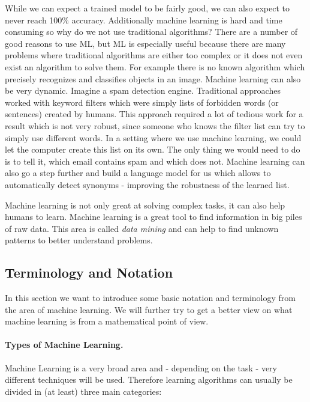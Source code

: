 While we can expect a trained model to be fairly good, we can also expect to never reach 100\% accuracy. Additionally machine learning is hard and time consuming so why do we not use traditional algorithms? There are a number of good reasons to use ML, but ML is especially useful because there are many problems where traditional algorithms are either too complex or it does not even exist an algorithm to solve them. For example there is no known algorithm which precisely recognizes and classifies objects in an image. Machine learning can also be very dynamic. Imagine a spam detection engine. Traditional approaches worked with keyword filters which were simply lists of forbidden words (or sentences) created by humans. This approach required a lot of tedious work for a result which is not very robust, since someone who knows the filter list can try to simply use different words. In a setting where we use machine learning, we could let the computer create this list on its own. The only thing we would need to do is to tell it, which email contains spam and which does not. Machine learning can also go a step further and build a language model for us which allows to automatically detect synonyms - improving the robustness of the learned list. 

Machine learning is not only great at solving complex tasks, it can also help humans to learn. Machine learning is a great tool to find information in big piles of raw data. This area is called \textit{data mining} and can help to find unknown patterns to better understand problems.

\subsection{Terminology and Notation} \label{ssec:MLNotation}
In this section we want to introduce some basic notation and terminology from the area of machine learning. We will further try to get a better view on what machine learning is from a mathematical point of view.

\paragraph{Types of Machine Learning.} Machine Learning is a very broad area and - depending on the task - very different techniques will be used. Therefore learning algorithms can usually be divided in (at least) three main categories:

